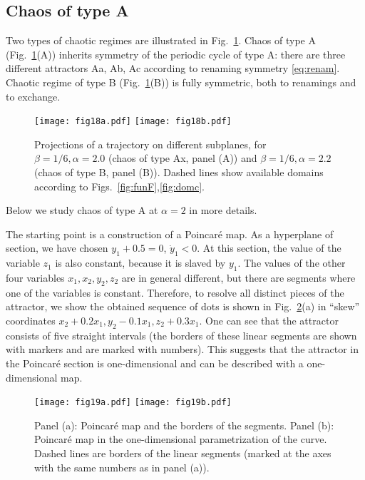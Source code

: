 \documentclass[3p,number,review,sort&compress]{elsarticle}
\begin{document}
\subsection{Chaos of type A}


Two types of chaotic regimes are illustrated 
in  Fig.~\ref{fig:trAB}. Chaos of type A (Fig.~\ref{fig:trAB}(A)) 
inherits symmetry of the periodic cycle of type A: there are 
three different attractors Aa, Ab, Ac according to renaming symmetry \eqref{eq:renam}. Chaotic regime of type B  (Fig.~\ref{fig:trAB}(B)) is fully symmetric,
both to renamings and to exchange.

\begin{figure}[!htb]
\centering
\texttt{[image: fig18a.pdf]}\hfill
\texttt{[image: fig18b.pdf]}
\caption{Projections of a trajectory on different subplanes, for $\beta=1/6,\alpha=2.0$ (chaos of type Ax, panel (A)) and $\beta=1/6,\alpha=2.2$ (chaos of type B, panel (B)). Dashed lines show available domains according to Figs.~\ref{fig:funF},\ref{fig:domc}.}
\label{fig:trAB}
\end{figure}

Below we study chaos of type A at $\alpha=2$ in more details.

The starting point is a construction of a Poincar\'e map. As a hyperplane 
of section, we have chosen $y_1+0.5=0$, $\dot y_1<0$. At this section,
the value of the variable $z_1$ is also constant, because it is slaved by $y_1$.
The values of the other four variables $x_1,x_2,y_2,z_2$ are in general different, but there are segments where one of the variables is constant. Therefore,
to resolve all distinct pieces of the attractor, we show the 
 obtained sequence of dots is shown in Fig.~\ref{fig:pmI2}(a) in ``skew'' coordinates 
$x_2+0.2x_1,y_2-0.1x_1,z_2+0.3 x_1$. One can see that the attractor
consists of five straight intervals (the borders of these linear segments
are shown with markers and are marked with numbers). This suggests that the
attractor in the Poincar\'e section is one-dimensional and can be described with a one-dimensional map.


\begin{figure}[!htb]
\centering
\texttt{[image: fig19a.pdf]}\hfill
\texttt{[image: fig19b.pdf]}
\caption{Panel (a): Poincar\'e map and the borders of the segments.
Panel (b): Poincar\'e map in the one-dimensional parametrization
of the curve. Dashed lines are borders of the linear segments (marked at the axes with the same numbers as in panel (a)).}
\label{fig:pmI2}
\end{figure}
\end{document}
